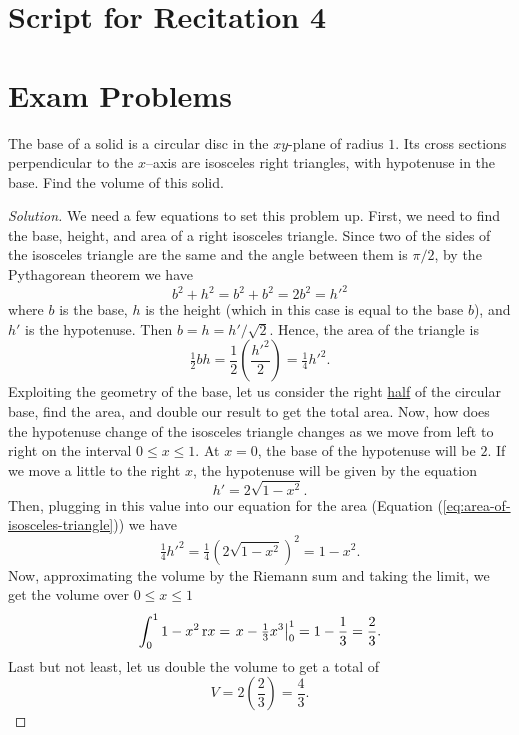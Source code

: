 \chapter{Script for Recitation 4}

\chapter{Exam Problems}
\begin{problem}[Fall 2015, \# 6]
The base of a solid is a circular disc in the $xy$-plane of radius
$1$. Its cross sections perpendicular to the $x$–axis are isosceles
right triangles, with hypotenuse in the base. Find the volume of this
solid.
\end{problem}
\begin{proof}[Solution]
We need a few equations to set this problem up. First, we need to find the
base, height, and area of a right isosceles triangle. Since two of the
sides of the isosceles triangle are the same and the angle between them is
$\pi/2$, by the Pythagorean theorem we have
\begin{equation}
\label{eq:base-height-of-isosceles}
b^2+h^2=b^2+b^2=2b^2={h'}^2
\end{equation}
where $b$ is the base, $h$ is the height (which in this case is equal to
the base $b$), and $h'$ is the hypotenuse. Then $b=h=h'/\sqrt{2}$. Hence,
the area of the triangle is
\begin{equation}
  \label{eq:area-of-isosceles-triangle}
\tfrac{1}{2}bh=\frac{1}{2}\left(\frac{{h'}^2}{2}\right)=\tfrac{1}{4}{h'}^2.
\end{equation}
Exploiting the geometry of the base, let us consider the right \ul{half}
of the circular base, find the area, and double our result to get the total
area. Now, how does the hypotenuse change of the isosceles triangle
changes as we move from left to right on the interval $0\leq x\leq 1$. At
$x=0$, the base of the hypotenuse will be $2$. If we move a little to the
right $x$, the hypotenuse will be given by the equation
\[
{h'}=2\sqrt{1-x^2}.
\]
Then, plugging in this value into our equation for the area (Equation
(\ref{eq:area-of-isosceles-triangle})) we have
\[
\tfrac{1}{4}{h'}^2=\tfrac{1}{4}\left(2\sqrt{1-x^2}\right)^2=1-x^2.
\]
Now, approximating the volume by the Riemann sum and taking the limit, we
get the volume over $0\leq x\leq 1$
\[
\int_0^1 1-x^2\,\mathrm{r} x=\left.x-\tfrac{1}{3}x^3\right|_0^1=1-\frac{1}{3}=\frac{2}{3}.
\]
Last but not least, let us double the volume to get a total of
\[
V=2\left(\frac{2}{3}\right)=\boxed{\frac{4}{3}.}
\]
\end{proof}




